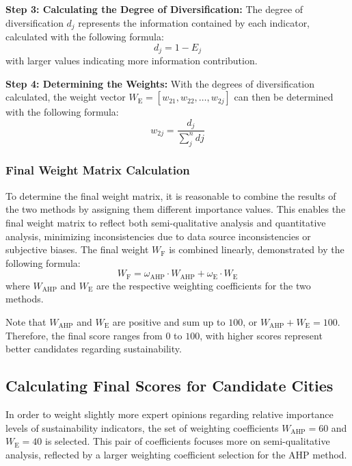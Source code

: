 \documentclass{mcmthesis}
\begin{document}
\textbf{Step 3: Calculating the Degree of Diversification:} The degree of diversification $d_j$ represents the information contained by each indicator, calculated with the following formula: 
\begin{equation} \label{eq:entropy_deg_of_diversification}
    d_j = 1 - E_j
\end{equation}
with larger values indicating more information contribution. 

\textbf{Step 4: Determining the Weights:} With the degrees of diversification calculated, the weight vector $W_\text{E}=[w_{21}, w_{22}, \dots, w_{2j}]$ can then be determined with the following formula:
\begin{equation} \label{eq:entropy_weights}
    w_{2j} = \frac{d_j}{\sum^n_{j} dj}
\end{equation}


\subsubsection{Final Weight Matrix Calculation} \label{subsubsec:weight_combination}

To determine the final weight matrix, it is reasonable to combine the results of the two methods by assigning them different importance values. This enables the final weight matrix to reflect both semi-qualitative analysis and quantitative analysis, minimizing inconsistencies due to data source inconsistencies or subjective biases. The final weight $W_\text{F}$ is combined linearly, demonstrated by the following formula: 
\begin{equation} \label{eq:weight_combination}
    W_\text{F} = \omega_\text{AHP} \cdot W_\text{AHP} + \omega_\text{E} \cdot W_\text{E}
\end{equation}
where $W_\text{AHP}$ and $W_\text{E}$ are the respective weighting coefficients for the two methods. 

Note that $W_\text{AHP}$ and $W_\text{E}$ are positive and sum up to $100$, or $W_\text{AHP} + W_\text{E} = 100$. Therefore, the final score ranges from $0$ to $100$, with higher scores represent better candidates regarding sustainability. 

\subsection{Calculating Final Scores for Candidate Cities}

In order to weight slightly more expert opinions regarding relative importance levels of sustainability indicators, the set of weighting coefficients $W_\text{AHP} = 60$ and $W_\text{E} = 40$ is selected. This pair of coefficients focuses more on semi-qualitative analysis, reflected by a larger weighting coefficient selection for the AHP method. 
\end{document}
